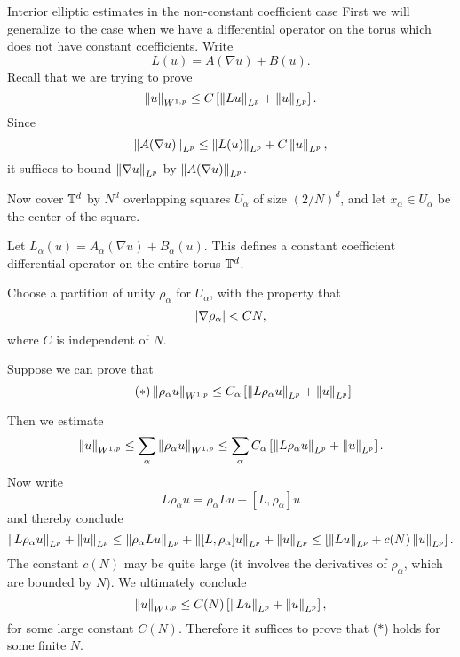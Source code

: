 \documentclass{amsart}
\begin{document}
\begin{clear}{Interior elliptic estimates in the non-constant
    coefficient case}  
First we will generalize to the case when we have a differential operator on the torus which does not have constant coefficients. Write
\begin{equation*}
  L(u)=A(\nabla u)+B(u).
\end{equation*}
Recall that we are trying to prove
\begin{equation*}
  \left\lVert u\right\rVert_{W^{1,p}}\le C\left[\left\lVert Lu\right\rVert_{L^{p}}+\left\lVert u\right\rVert_{L^{p}}\right].
\end{equation*}
Since
\begin{equation*}
  \left\lVert A(\nabla u)\right\rVert_{L^{p}}\le \left\lVert L(u)\right\rVert_{L^{p}}+C\left\lVert u\right\rVert_{L^{p}},
\end{equation*}
it suffices to bound $\left\lVert\nabla u\right\rVert_{L^{p}}$ by $\left\lVert A(\nabla u)\right\rVert_{L^{p}}$.

Now cover $\mathbb{T}^{d}$ by $N^{d}$ overlapping squares $U_{\alpha}$ of size $(2/N)^{d}$, and let $x_{\alpha}\in U_{\alpha}$ be the center of the square.

Let $L_{\alpha}(u)=A_{\alpha}(\nabla u)+B_{\alpha}(u)$. This defines a constant coefficient differential operator on the entire torus $\mathbb{T}^{d}$.

Choose a partition of unity $\rho_{\alpha}$ for $U_{\alpha}$, with the property that
\begin{equation*}
  \left|\nabla \rho_{\alpha}\right|<CN,
\end{equation*}
where $C$ is independent of $N$.

Suppose we can prove that
\begin{equation*}\tag{$\ast$}
  \left\lVert\rho_{\alpha}u\right\rVert_{W^{1,p}}\le C_{\alpha}\left[\left\lVert L\rho_{\alpha}u\right\rVert_{L^{p}}+\left\lVert u\right\rVert_{L^{p}}\right]
\end{equation*}

Then we estimate
\begin{equation*}
  \left\lVert u\right\rVert_{W^{1,p}}\le \sum_{\alpha}\left\lVert\rho_{\alpha}u\right\rVert_{W^{1,p}}\le \sum_{\alpha}C_{\alpha}\left[\left\lVert L\rho_{\alpha}u\right\rVert_{L^{p}}+\left\lVert u\right\rVert_{L^{p}}\right].
\end{equation*}
Now write
\begin{equation*}
  L\rho_{\alpha}u=\rho_{\alpha}Lu+[L,\rho_{\alpha}]u
\end{equation*}
and thereby conclude
\begin{equation*}
  \left\lVert L\rho_{\alpha}u\right\rVert_{L^{p}}+\left\lVert u\right\rVert_{L^{p}}\le \left\lVert\rho_{\alpha}Lu\right\rVert_{L^{p}}+\left\lVert[L,\rho_{\alpha}]u\right\rVert_{L^{p}}+\left\lVert u\right\rVert_{L^{p}}\le \left[\left\lVert Lu\right\rVert_{L^{p}}+c(N)\left\lVert u\right\rVert_{L^{p}}\right].
\end{equation*}
The constant $c(N)$ may be quite large (it involves the derivatives of $\rho_{\alpha}$, which are bounded by $N$). We ultimately conclude
\begin{equation*}
  \left\lVert u\right\rVert_{W^{1,p}}\le C(N) \left[\left\lVert Lu\right\rVert_{L^{p}}+\left\lVert u\right\rVert_{L^{p}}\right],
\end{equation*}
for some large constant $C(N)$. Therefore it suffices to prove that ($\ast$) holds for some finite $N$.


\end{clear}
\end{document}
